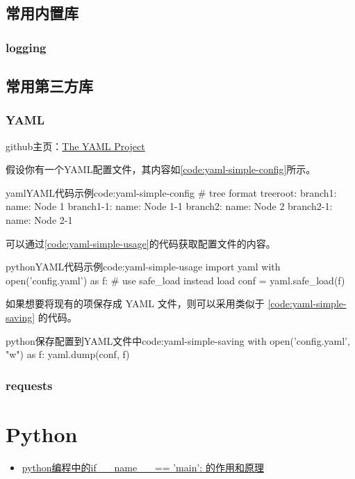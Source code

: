 \section{常用内置库}
\subsection{logging}


\section{常用第三方库}
\subsection{YAML}
github主页：\href{https://github.com/yaml}{The YAML Project}

假设你有一个YAML配置文件，其内容如\ref{code:yaml-simple-config}所示。

\begin{jcode}{yaml}{YAML代码示例}{code:yaml-simple-config}
# tree format
treeroot:
    branch1:
        name: Node 1
        branch1-1:
            name: Node 1-1
    branch2:
        name: Node 2
        branch2-1:
            name: Node 2-1
\end{jcode}

可以通过\ref{code:yaml-simple-usage}的代码获取配置文件的内容。

\begin{jcode}{python}{YAML代码示例}{code:yaml-simple-usage}
import yaml
with open('config.yaml') as f:
    # use safe_load instead load
    conf = yaml.safe_load(f)
\end{jcode}

如果想要将现有的项保存成 YAML 文件，则可以采用类似于 \ref{code:yaml-simple-saving} 的代码。
\begin{jcode}{python}{保存配置到YAML文件中}{code:yaml-simple-saving}
with open('config.yaml', "w") as f:
    yaml.dump(conf, f)
\end{jcode}


\subsection{requests}

\chapter{Python}

\begin{itemize}
\item \href{http://www.dengfeilong.com/post/60.html}{python编程中的if \_\_name\_\_ == 'main': 的作用和原理}
\end{itemize}

